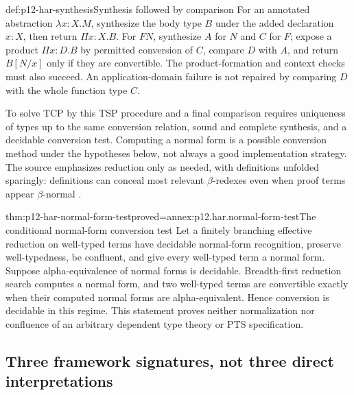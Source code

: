 \begin{hbmethod}{def:p12-har-synthesis}{Synthesis followed by comparison}
For an annotated abstraction \(\lambda x:X.M\), synthesize the body type
\(B\) under the added declaration \(x:X\), then return \(\Pi x:X.B\).
For \(F N\), synthesize \(A\) for \(N\) and \(C\) for \(F\);
expose a product \(\Pi x:D.B\) by permitted conversion of \(C\),
compare \(D\) with \(A\), and return \(B[N/x]\) only if they are
convertible. The product-formation and context checks must also succeed.
An application-domain failure is not repaired by comparing \(D\) with
the whole function type \(C\).

To solve TCP by this TSP procedure and a final comparison requires
uniqueness of types up to the same conversion relation, sound and complete
synthesis, and a decidable conversion test. Computing a normal form is a
possible conversion method under the hypotheses below, not always a good
implementation strategy. The source emphasizes reduction only as needed,
with definitions unfolded sparingly: definitions can conceal most relevant
\(\beta\)-redexes even when proof terms appear \(\beta\)-normal
\cite[pp.~1158--1160]{BarendregtGeuvers2001}.
\end{hbmethod}

\begin{hbtheorem}{thm:p12-har-normal-form-test}{proved=annex:p12.har.normal-form-test}{The conditional normal-form conversion test}
Let a finitely branching effective reduction on well-typed terms have
decidable normal-form recognition, preserve well-typedness, be confluent,
and give every well-typed term a normal form. Suppose alpha-equivalence of
normal forms is decidable. Breadth-first reduction search computes a normal
form, and two well-typed terms are convertible exactly when their computed
normal forms are alpha-equivalent. Hence conversion is decidable in this
regime. This statement proves neither normalization nor confluence of an
arbitrary dependent type theory or PTS specification.
\end{hbtheorem}

\subsection{Three framework signatures, not three direct interpretations}

